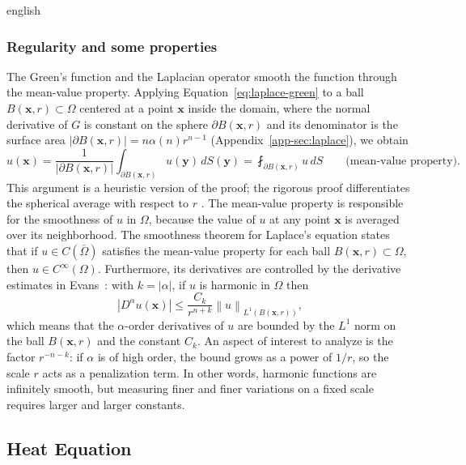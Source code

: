 \documentclass[12pt,letterpaper,twoside]{book}
\newcommand{\norm}[1]{\left\lVert #1 \right\rVert}
\newcommand{\abs}[1]{\left\lvert #1 \right\rvert}
\begin{document}
\begin{hyphenrules}{english}
\subsubsection{Regularity and some properties}
The Green's function and the Laplacian operator smooth the function through the mean-value property.
Applying Equation~\eqref{eq:laplace-green} to a ball $B(\mathbf{x},r)\subset\Omega$ centered at a point $\mathbf{x}$
inside the domain, where the normal derivative of $G$ is constant on the sphere $\partial B(\mathbf{x},r)$ and
its denominator is the surface area $\abs{\partial B(\mathbf{x},r)}=n\alpha(n)r^{n-1}$
(Appendix~\ref{app-sec:laplace}), we obtain
\begin{equation}
  u(\mathbf{x})=\frac{1}{\abs{\partial B(\mathbf{x},r)}}\int_{\partial B(\mathbf{x},r)}u(\mathbf{y})\,d S(\mathbf{y})
  =\fint_{\partial B(\mathbf{x},r)}u\,d S \qquad\text{(mean-value property)}.
  \label{eq:mvp}
\end{equation}
This argument is a heuristic version of the proof; the rigorous proof differentiates the spherical
average with respect to $r$ \cite[Section 2.2.2]{evans2010}. The mean-value property is
responsible for the smoothness of $u$ in $\Omega$, because the value of $u$ at any point $\mathbf{x}$ is
averaged over its neighborhood. The smoothness theorem for Laplace's equation states that if
$u\in C(\bar\Omega)$ satisfies the mean-value property for each ball $B(\mathbf{x},r)\subset\Omega$, then
$u\in C^\infty(\Omega)$. Furthermore, its derivatives are controlled by the derivative estimates in
Evans~\cite{evans2010}: with $k=\abs{\alpha}$, if $u$ is harmonic in $\Omega$ then
\begin{equation}
  \abs{D^\alpha u(\mathbf{x})}\le\frac{C_k}{r^{n+k}}\norm{u}_{L^1(B(\mathbf{x},r))},
  \label{eq:harmonic-estimate}
\end{equation}
which means that the $\alpha$-order derivatives of $u$ are bounded by the $L^1$ norm on the ball
$B(\mathbf{x},r)$ and the constant $C_k$. An aspect of interest to analyze is the factor $r^{-n-k}$: if $\alpha$
is of high order, the bound grows as a power of $1/r$, so the scale $r$ acts as a penalization term.
In other words, harmonic functions are infinitely smooth, but measuring finer and finer variations on a
fixed scale requires larger and larger constants.

\subsection{Heat Equation}\label{subsec:heat}


\end{hyphenrules}
\end{document}
